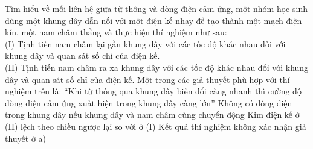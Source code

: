 	\begin{ex}%
		Tìm hiểu về mối liên hệ giữa từ thông và dòng điện cảm ứng, một nhóm học sinh dùng một khung dây dẫn nối với một điện kế nhạy để tạo thành một mạch điện kín, một nam châm thẳng và thực hiện thí nghiệm như sau:\\
		(I) Tịnh tiến nam châm lại gần khung dây với các tốc độ khác nhau đối với khung dây và quan sát số chỉ của điện kế.\\
		(II) Tịnh tiến nam châm ra xa khung dây với các tốc độ khác nhau đối với khung dây và quan sát số chỉ của điện kế.
		\choiceTFt
		{\True Một trong các giả thuyết phù hợp với thí nghiệm trên là: ``Khi từ thông qua khung dây biến đổi càng nhanh thì cường độ dòng điện cảm ứng xuất hiện trong khung dây càng lớn''}
		{Không có dòng điện trong khung dây nếu khung dây và nam châm cùng chuyển động}
		{\True Kim điện kế ở (II) lệch theo chiều ngược lại so với ở (I)}
		{Kết quả thí nghiệm không xác nhận giả thuyết ở a)}
	\end{ex}

